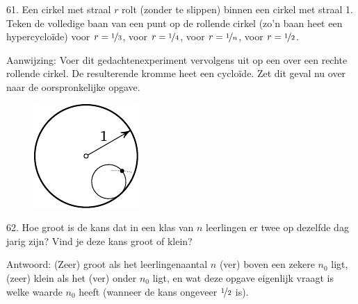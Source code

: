 \begin{problem}{61.}
	Een cirkel met straal $r$ rolt (zonder te slippen) binnen een cirkel met straal 1. Teken de volledige baan van een punt op de rollende cirkel (zo'n baan heet een hypercycloïde) voor $r=\nicefrac{1}{3}$, voor $r=\nicefrac{1}{4}$, voor $r=\nicefrac{1}{n}$, voor $r=\nicefrac{1}{2}$.
\\
	\begin{note}{Aanwijzing:}
		Voer dit gedachtenexperiment vervolgens uit op een over een rechte rollende cirkel. De resulterende kromme heet een cy\-cloïde. Zet dit geval nu over naar de oorspronkelijke opgave.
	\end{note}
	\begin{figure}
		\null\hfill
		\includegraphics{resources/taskbook-45}
		\hfill\null
	\end{figure}
\end{problem}

\begin{problem}{62.}
	Hoe groot is de kans dat in een klas van $n$ leerlingen er twee op dezelfde dag jarig zijn? Vind je deze kans groot of klein?
\\
	\begin{note}{Antwoord:}
		(Zeer) groot als het leerlingenaantal $n$ (ver) boven een zekere $n_0$ ligt, (zeer) klein als het (ver) onder $n_0$ ligt, en wat deze opgave eigenlijk vraagt is welke waarde $n_0$ heeft (wanneer de kans ongeveer $\nicefrac{1}{2}$ is).
	\end{note}
\end{problem}

\clearpage

